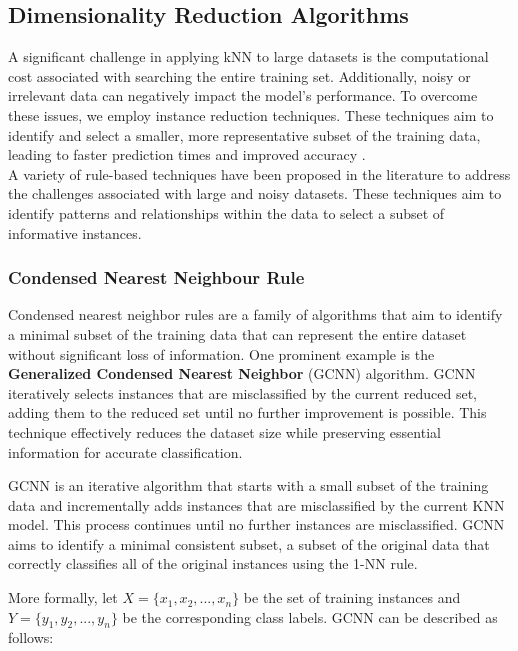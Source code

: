 \subsection{Dimensionality Reduction Algorithms}
\label{subsec:methods-reduction}

A significant challenge in applying kNN to large datasets is the computational cost 
associated with searching the entire training set. Additionally, noisy or irrelevant 
data can negatively impact the model's performance. 
To overcome these issues, we employ instance reduction techniques. 
These techniques aim to identify and select a smaller, more representative subset of
the training data, leading to faster prediction times and improved accuracy \cite{Wilson2000}.\\

A variety of rule-based techniques have been proposed in the literature to 
address the challenges associated with large and noisy datasets. 
These techniques aim to identify patterns and relationships within the data to select 
a subset of informative instances.

\subsubsection{Condensed Nearest Neighbour Rule}
Condensed nearest neighbor rules are a family of algorithms that aim to identify 
a minimal subset of the training data that can represent the entire dataset without 
significant loss of information. One prominent example is the \textbf{Generalized Condensed 
Nearest Neighbor} (GCNN) algorithm.
GCNN iteratively selects instances that are misclassified by the current reduced set, 
adding them to the reduced set until no further improvement is possible. 
This technique effectively reduces the dataset size while preserving essential 
information for accurate classification.

GCNN \cite{hart1968condensed} is an iterative algorithm that starts with a small subset of 
the training data and incrementally adds instances that are misclassified by the current KNN model. 
This process continues until no further instances are misclassified. GCNN aims to identify a minimal 
consistent subset, a subset of the original data that correctly classifies all of the original 
instances using the 1-NN rule.

More formally, let $X = \{x_1, x_2, ..., x_n\}$ be the set of training instances and $Y = \{y_1, y_2, ..., y_n\}$ be 
the corresponding class labels. GCNN can be described as follows:

